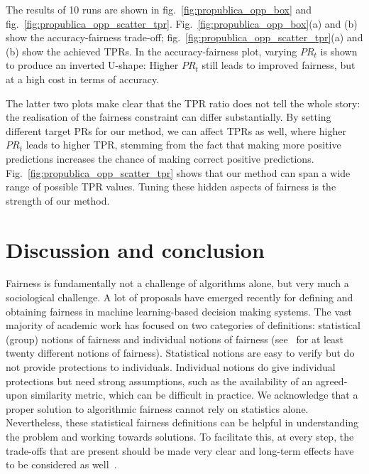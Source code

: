 The results of 10 runs are shown in fig.~\ref{fig:propublica_opp_box} and fig.~\ref{fig:propublica_opp_scatter_tpr}.
Fig.~\ref{fig:propublica_opp_box}(a) and (b) show the accuracy-fairness trade-off;
fig.~\ref{fig:propublica_opp_scatter_tpr}(a) and (b) show the achieved TPRs.
In the accuracy-fairness plot, varying $\mathit{PR}_t$ is shown to produce an inverted U-shape:
Higher $\mathit{PR}_t$ still leads to improved fairness, but at a high cost in terms of accuracy.

The latter two plots make clear that the TPR ratio does not tell the whole story:
the realisation of the fairness constraint can differ substantially.
By setting different target PRs for our method, we can affect TPRs as well,
where higher $\mathit{PR}_t$ leads to higher TPR,
stemming from the fact that making more positive predictions increases the chance of making correct positive predictions.
Fig.~\ref{fig:propublica_opp_scatter_tpr} shows that our method can span a wide range of possible TPR values.
Tuning these hidden aspects of fairness is the strength of our method.

\section{Discussion and conclusion}
Fairness is fundamentally not a challenge of algorithms alone, but very much a sociological challenge.
%
A lot of proposals have emerged recently for defining and obtaining fairness in machine learning-based decision making systems. 
%
The vast majority of academic work has focused on two categories of definitions: statistical (group) notions of fairness and individual notions of fairness (see~\citet{verma2018fairness} for at least twenty different notions of fairness).
%
Statistical notions are easy to verify but do not provide protections to individuals. 
%
Individual notions do give individual protections but need strong assumptions, such as the availability of an agreed-upon similarity metric, which can be difficult in practice.
%
We acknowledge that a proper solution to algorithmic fairness cannot rely on statistics alone.
%
Nevertheless, these statistical fairness definitions can be helpful in understanding the problem and working towards solutions.
%
To facilitate this, at every step, the trade-offs that are present should be made very clear
and long-term effects have to be considered as well~\citep{liu2018delayed,kallus2018residual}.

